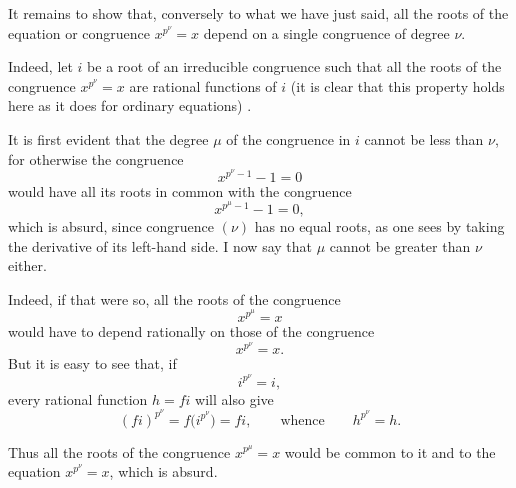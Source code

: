 It remains to show that, conversely to what we have just said, all the
roots of the equation or congruence $x^{p^\nu}=x$ depend on a single
congruence of degree $\nu$.

Indeed, let $i$ be a root of an irreducible congruence such that all the
roots of the congruence $x^{p^\nu}=x$ are rational functions of $i$ (it
is clear that this property holds here as it does for ordinary
equations)
.


It is first evident that the degree $\mu$ of the congruence in $i$ cannot
be less than $\nu$, for otherwise the congruence
\[
\tag{$\nu$}
x^{p^\nu-1}-1=0
\]
would have all its roots in common with the congruence
\[
x^{p^\mu-1}-1=0,
\]
which is absurd, since congruence $(\nu)$ has no equal roots, as one sees
by taking the derivative of its left-hand side. I now say that $\mu$
cannot be greater than $\nu$ either.

Indeed, if that were so, all the roots of the congruence
\[
x^{p^\mu}=x
\]
would have to depend rationally on those of the congruence
\[
x^{p^\nu}=x.
\]
But it is easy to see that, if
\[
i^{p^\nu}=i,
\]
every rational function $h=fi$ will also give
\[
(fi)^{p^\nu}=f\bigl(i^{p^\nu}\bigr)=fi,\qquad\text{whence}\qquad h^{p^\nu}=h.
\]

Thus all the roots of the congruence $x^{p^\mu}=x$ would be common
to it and to the equation $x^{p^\nu}=x$, which is absurd.


